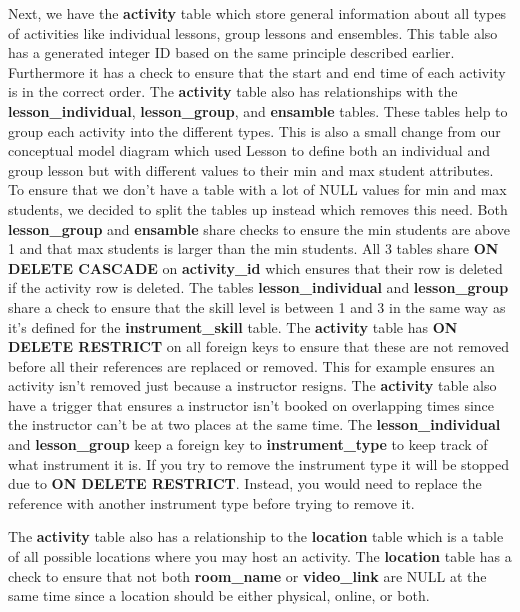 \documentclass[a4paper]{scrartcl}
\begin{document}
Next, we have the \textbf{activity} table which store general information about all types of activities like individual lessons, group lessons and ensembles. This table also has a generated integer ID based on the same principle described earlier. Furthermore it has a check to ensure that the start and end time of each activity is in the correct order. The \textbf{activity} table also has relationships with the \textbf{lesson\_individual}, \textbf{lesson\_group}, and \textbf{ensamble} tables. These tables help to group each activity into the different types. This is also a small change from our conceptual model diagram which used Lesson to define both an individual and group lesson but with different values to their min and max student attributes. To ensure that we don't have a table with a lot of NULL values for min and max students, we decided to split the tables up instead which removes this need. Both \textbf{lesson\_group} and \textbf{ensamble} share checks to ensure the min students are above 1 and that max students is larger than the min students. All 3 tables share \textbf{ON DELETE CASCADE} on \textbf{activity\_id} which ensures that their row is deleted if the activity row is deleted. The tables \textbf{lesson\_individual} and \textbf{lesson\_group} share a check to ensure that the skill level is between 1 and 3 in the same way as it's defined for the \textbf{instrument\_skill} table. The \textbf{activity} table has \textbf{ON DELETE RESTRICT} on all foreign keys to ensure that these are not removed before all their references are replaced or removed. This for example ensures an activity isn't removed just because a instructor resigns. The \textbf{activity} table also have a trigger that ensures a instructor isn't booked on overlapping times since the instructor can't be at two places at the same time. The \textbf{lesson\_individual} and \textbf{lesson\_group} keep a foreign key to \textbf{instrument\_type} to keep track of what instrument it is. If you try to remove the instrument type it will be stopped due to \textbf{ON DELETE RESTRICT}. Instead, you would need to replace the reference with another instrument type before trying to remove it.

The \textbf{activity} table also has a relationship to the \textbf{location} table which is a table of all possible locations where you may host an activity. The \textbf{location} table has a check to ensure that not both \textbf{room\_name} or \textbf{video\_link} are NULL at the same time since a location should be either physical, online, or both.
\end{document}

